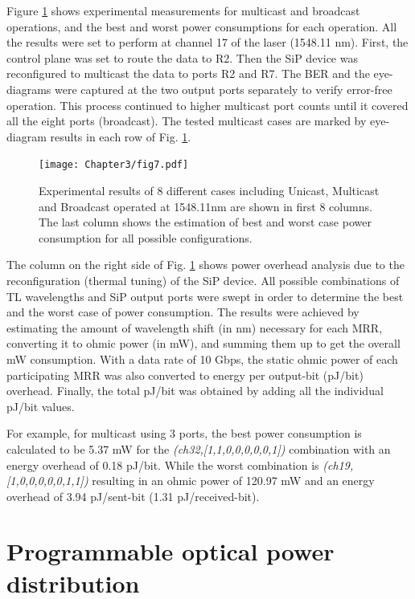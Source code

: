 Figure \ref{fig7} shows experimental measurements for multicast and broadcast operations, and the best and worst power consumptions for each operation. All the results were set to perform at channel 17 of the laser (1548.11 nm). First, the control plane was set to route the data to R2. Then the SiP device was reconfigured to multicast the data to ports R2 and R7. The BER and the eye-diagrams were captured at the two output ports separately to verify error-free operation. This process continued to higher multicast port counts until it covered all the eight ports (broadcast). The tested multicast cases are marked by eye-diagram results in each row of Fig. \ref{fig7}. 

\begin{figure}[t!]
\begin{center}
\texttt{[image: Chapter3/fig7.pdf]}
\caption{Experimental results of 8 different cases including Unicast, Multicast and Broadcast operated at 1548.11nm are shown in first 8 columns. The last column shows the estimation of best and worst case power consumption for all possible configurations. }
\label{fig7}
\end{center}
\vspace{-0.9cm}
\end{figure}

The column on the right side of Fig. \ref{fig7} shows power overhead analysis due to the reconfiguration (thermal tuning) of the SiP device. All possible combinations of TL wavelengths and SiP output ports were swept in order to determine the best and the worst case of power consumption. The results were achieved by estimating the amount of wavelength shift (in nm) necessary for each MRR, converting it to ohmic power (in mW), and summing them up to get the overall mW consumption. With a data rate of 10 Gbps, the static ohmic power of each participating MRR was also converted to energy per output-bit (pJ/bit) overhead. Finally, the total pJ/bit was obtained by adding all the individual pJ/bit values.

For example, for multicast using 3 ports, the best power consumption is calculated to be 5.37 mW for the \textit{(ch32,[1,1,0,0,0,0,0,1])} combination with an energy overhead of 0.18 pJ/bit. While the worst combination is \textit{(ch19,[1,0,0,0,0,0,1,1])} resulting in an ohmic power of 120.97 mW and an energy overhead of 3.94 pJ/sent-bit (1.31 pJ/received-bit).

\section{Programmable optical power distribution}

